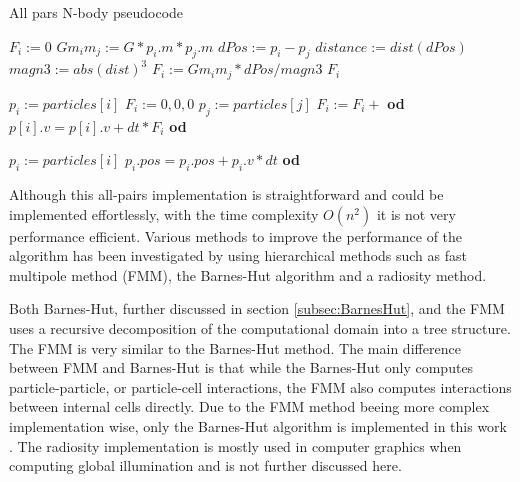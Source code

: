 \begin{algorithm}
    \caption{All pars N-body pseudocode}
    \label{alg:allpairspseudocode}
    \begin{algorithmic}[1]

        \State $F_i := 0$
        \State $Gm_im_j := G *p_i.m * p_j.m$
        \State $dPos := p_i - p_j$
        \State $distance := dist(dPos)$
        \State $magn3 := abs(dist)^3$
        \State $F_i := Gm_im_j * dPos / magn3$
        \State \Return $F_i$
        
    \EndProcedure
    
    
            \State $p_i := particles[i]$
            \State $F_i := {0,0,0}$
                \State $p_j := particles[j]$
                \State $F_i := F_i +$ 
            \EndFor
            \State \textbf{od} %
            \State $p[i].v = p[i].v + dt*F_i$
        \EndFor
        \State \textbf{od} %
        
            \State $p_i := particles[i]$
            \State $p_i.pos = p_i.pos + p_i.v * dt$
        \EndFor
        \State \textbf{od}
    \EndProcedure
        
        
    \end{algorithmic}
\end{algorithm}

Although this all-pairs implementation is straightforward and could be implemented effortlessly, with the time complexity $O(n^2)$ it is not very performance efficient. Various methods to improve the performance of the algorithm has been investigated by using hierarchical methods such as fast multipole method (FMM), the Barnes-Hut algorithm and a radiosity method. \cite{singh1995load}\cite{barnes1986hierarchical} 

Both Barnes-Hut, further discussed in section \ref{subsec:BarnesHut}, and the FMM uses a recursive decomposition of the computational domain into a tree structure. The FMM is very similar to the Barnes-Hut method. The main difference between FMM and Barnes-Hut is that while the Barnes-Hut only computes particle-particle, or particle-cell interactions, the FMM also computes interactions between internal cells directly. Due to the FMM method beeing more complex implementation wise, only the Barnes-Hut algorithm is implemented in this work \cite{singh1995load}. The radiosity implementation is mostly used in computer graphics when computing global illumination and is not further discussed here.

